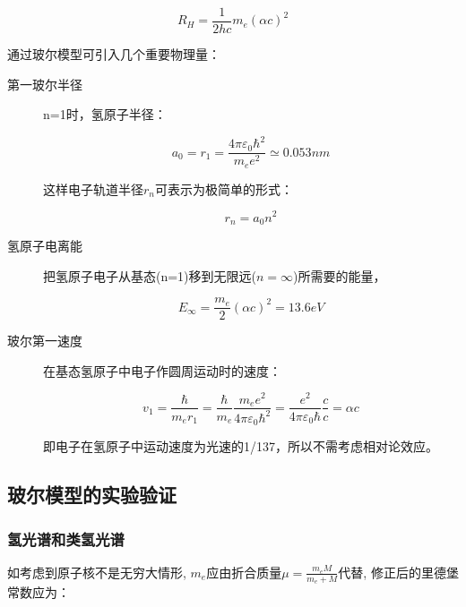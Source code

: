 \begin{equation}
R_H = \frac{1}{{2hc}}m_e \left( {\alpha c} \right)^2
\end{equation}

通过玻尔模型可引入几个重要物理量：

\begin{description}
    \item[第一玻尔半径] n=1时，氢原子半径：
    
\begin{equation}
a_0  = r_1  = \frac{{4\pi \varepsilon _0 \hbar ^2 }}{{m_e e^2 }} \simeq 0.053 nm
\end{equation}

这样电子轨道半径$r_n$可表示为极简单的形式：
    
\begin{equation}
r_n  = a_0 n^2
\end{equation}


    \item[氢原子电离能] 把氢原子电子从基态(n=1)移到无限远($n = \infty $)所需要的能量，
    
\begin{equation}
E_\infty   = \frac{{m_e }}{2}\left( {\alpha c} \right)^2  = 13.6eV
\end{equation}

    \item[玻尔第一速度] 在基态氢原子中电子作圆周运动时的速度：
    
\begin{equation}
v_1  = \frac{\hbar }{{m_e r_1 }} = \frac{\hbar }{{m_e }}\frac{{m_e e^2 }}{{4\pi \varepsilon _0 \hbar ^2 }} = \frac{{e^2 }}{{4\pi \varepsilon _0 \hbar }}\frac{c}{c} = \alpha c
\end{equation}

即电子在氢原子中运动速度为光速的1/137，所以不需考虑相对论效应。

\end{description}

\subsection{玻尔模型的实验验证}

\subsubsection{氢光谱和类氢光谱}

如考虑到原子核不是无穷大情形, $m_e $应由折合质量$\mu  = \frac{{m_e
M}}{{m_e  + M}}$代替, 修正后的里德堡常数应为：

